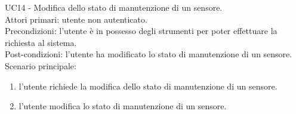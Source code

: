 \leavevmode\newline
UC14 - Modifica dello stato di manutenzione di un sensore.
\\
Attori primari: utente non autenticato.
\\
Precondizioni: l'utente è in possesso degli strumenti per poter effettuare la richiesta al sistema.
\\
Post-condizioni: l'utente ha modificato lo stato di manutenzione di un sensore.
\\
Scenario principale:
\begin{enumerate}
    \item l'utente richiede la modifica dello stato di manutenzione di un sensore.
    \item l'utente modifica lo stato di manutenzione di un sensore.
\end{enumerate}

